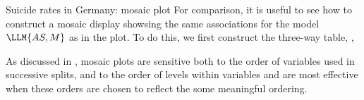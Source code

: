 \documentclass[11pt]{book}
\renewenvironment{knitrout}{\small\renewcommand{\baselinestretch}{.85}}{} %
\begin{document}
\begin{Example}[suicide2]{Suicide rates in Germany: mosaic plot}
For comparison, it is useful to see how to construct a mosaic display 
showsing the same associations for the \loglin model $\LLM{AS,M}$
as in the \ca plot.  To do this, we first construct the 
three-way table, ,
\begin{knitrout}
\color{fgcolor}\begin{kframe}
\begin{alltt}
 \hlkwb{<-}  \hlopt{~}  \hlopt{+}  \hlopt{+}  
\end{alltt}
\end{kframe}
\end{knitrout}
As discussed in , mosaic plots are sensitive both to
the order of variables used in successive splits, and to the order of
levels within variables and are most effective when these orders
are chosen to reflect the some meaningful ordering.


\end{Example}
\end{document}
